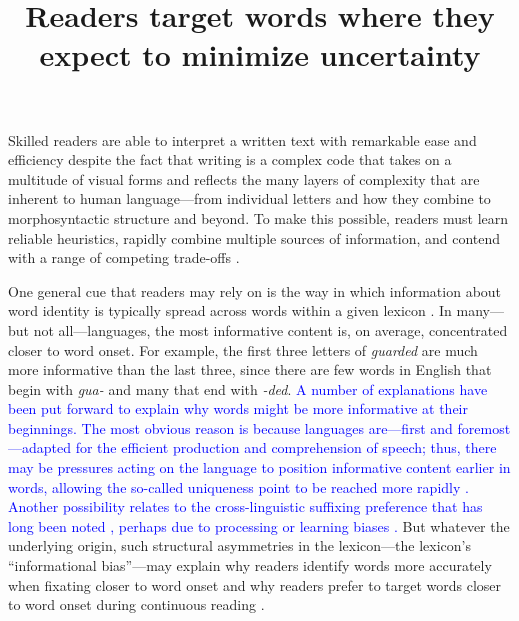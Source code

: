 \documentclass[doc,biblatex]{apa7}
\title{Readers target words where they expect to minimize uncertainty}
\newcommand\newmaterial[1]{\textcolor{blue}{#1}}
\begin{document}
\maketitle

\noindent
Skilled readers are able to interpret a written text with remarkable ease and efficiency despite the fact that writing is a complex code that takes on a multitude of visual forms and reflects the many layers of complexity that are inherent to human language---from individual letters and how they combine to morphosyntactic structure and beyond. To make this possible, readers must learn reliable heuristics, rapidly combine multiple sources of information, and contend with a range of competing trade-offs \parencite{Rayner:1998, Yeatman:2021, Snowling:2022}.

One general cue that readers may rely on is the way in which information about word identity is typically spread across words within a given lexicon \parencite{Farid:1996, Clark:1999, Deutsch:1999, Alhama:2019, Shafir:2022}. In many---but not all---languages, the most informative content is, on average, concentrated closer to word onset. For example, the first three letters of \textit{guarded} are much more informative than the last three, since there are few words in English that begin with \textit{gua-} and many that end with \textit{-ded}. \newmaterial{A number of explanations have been put forward to explain why words might be more informative at their beginnings. The most obvious reason is because languages are---first and foremost---adapted for the efficient production and comprehension of speech; thus, there may be pressures acting on the language to position informative content earlier in words, allowing the so-called uniqueness point to be reached more rapidly \parencite{MarslenWilson:1987}. Another possibility relates to the cross-linguistic suffixing preference that has long been noted \parencite{Greenberg:1957}, perhaps due to processing or learning biases \parencite{Cutler:1985, Hawkins:1988, Martin:2020, Ramscar:2013, StClair:2009}.} But whatever the underlying origin, such structural asymmetries in the lexicon---the lexicon's ``informational bias''---may explain why readers identify words more accurately when fixating closer to word onset \parencite[the optimal viewing position;][]{ORegan:1984, Brysbaert:2005, Hyona:2011} and why readers prefer to target words closer to word onset during continuous reading \parencite[the preferred landing position;][]{McConkie:1988, Vitu:1990, Ducrot:2002}.
\end{document}
